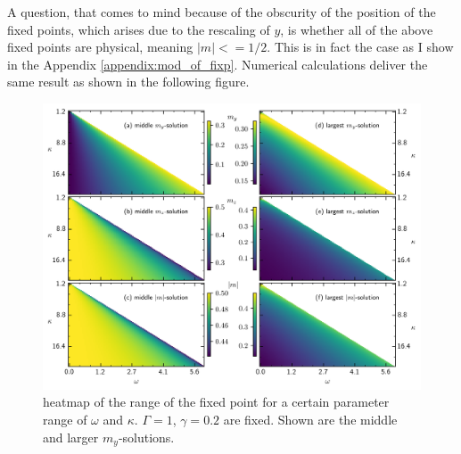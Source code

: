 \documentclass{article}
\begin{document}
\newpage
A question, that comes to mind because of the obscurity of the position of the fixed points, which arises due to the rescaling of $y$, is whether all of the above fixed points are physical, meaning $|m|<=1/2$. This is in fact the case as I show in the Appendix \ref{appendix:mod_of_fixp}. Numerical calculations deliver the same result as shown in the following figure.
\begin{figure}[H]
    \hspace*{-1cm}
    \includegraphics{pictures/fixp_bound_heatmap_ml.png}
    \caption{heatmap of the range of the fixed point for a certain parameter range of $\omega$ and $\kappa$. $\Gamma=1$, $\gamma=0.2$ are fixed. Shown are the middle and larger $m_y$-solutions.}
    \label{fig:fixp_midlarge_bound_hm}
\end{figure}
%     
\end{document}
